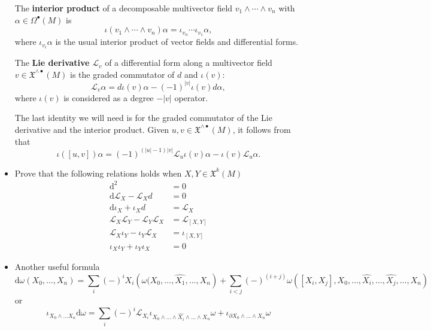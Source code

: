 \documentclass[a4paper,12pt]{scrartcl}
\newcommand{\LX}{\mathfrak{X}^{\wedge {\bullet}}}
\renewcommand{\L}{\mathcal{L}}
\renewcommand{\deg}[1]{\left \lvert #1 \right \rvert}
\newcommand{\ExtD}{\textrm{d}}
\newcommand{\Lie}{\mathcal{L}}
\providecommand{\Lie}{\mathcal{L}}%
\begin{document}
\begin{itemize}
The \textbf{interior product} of a decomposable
multivector field $v_{1} \wedge \cdots \wedge v_{n}$ with $\alpha \in \Omega^{\bullet}(M)$ is
\begin{equation} \label{interior}
\iota(v_{1} \wedge \cdots \wedge v_{n}) \alpha = \iota_{v_{n}} \cdots
\iota_{v_{1}} \alpha,
\end{equation}
where $\iota_{v_{i}} \alpha$ is the usual interior product of vector
fields and differential forms. 

The \textbf{Lie derivative} $\L_{v}$ of a differential form along a multivector field $v \in
\LX(M)$ is the graded commutator of $d$ and $\iota(v)$:
\begin{equation} \label{Lie}
\L_{v} \alpha =  d \iota(v) \alpha - (-1)^{\deg{v}} \iota(v) d\alpha,
\end{equation}
where $\iota(v)$ is considered as a degree $-\deg{v}$ operator.

The last identity we will need is for the graded commutator of
the Lie derivative and the interior product. Given $u,v \in
\LX(M)$, it follows from  \cite[Proposition A3]{Forger} that
\begin{equation} \label{commutator}
\iota([u,v]) \alpha = (-1)^{(\deg{u}-1)\deg{v}} \L_{u} \iota(v)  \alpha - \iota(v)\L_{u} \alpha.
\end{equation}
	
	\item Prove that the following relations holds when $X,Y \in \mathfrak{X}^k(M)$
				\begin{align}
					\ExtD^2 &= 0 \label{cartfirst}\\
					\ExtD \Lie_X - \Lie_X d &= 0 \\
					\ExtD \iota_X + \iota_X d &= \Lie_X \label{magic}\\
					\Lie_X \Lie_Y - \Lie_Y \Lie_X &= \Lie_{[X,Y]} \\
					\Lie_X \iota_Y - \iota_Y \Lie_X &= \iota_{[X,Y]}\\
					\iota_X \iota_Y + \iota_Y \iota_X &= 0 \label{cartlast}
				\end{align}	
	


	\item Another useful formula
		\begin{displaymath}
			\ExtD \omega (X_0, \ldots, X_n) = 
			\sum_i (-)^i X_i\left( \omega(X_0,\ldots,\hat{X_1},\ldots,X_n \right) +
			\sum_{i < j} (-)^{(i+j)} \omega\left([X_i,X_j],X_0,\ldots,\hat{X_i},\ldots,\hat{X_j},\ldots, X_n \right)
		\end{displaymath}
		or
		\begin{displaymath}
		\iota_{X_0\wedge \ldots X_n} \ExtD \omega =
		\sum_i (-)^i \Lie_{X_i} \iota_{X_0\wedge\ldots\wedge \hat{X_i}\wedge\ldots\wedge X_n} \omega
		+ \iota_{\partial X_0 \wedge\ldots\wedge X_n} \omega		
		\end{displaymath}


	\end{itemize}
\end{document}
